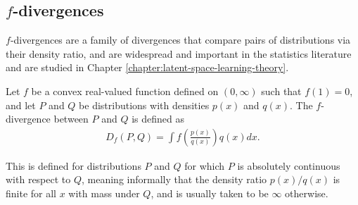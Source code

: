 \subsection{$f$-divergences}\label{subsec:f-divergences-intro}



$f$-divergences are a family of divergences that compare pairs of distributions via their density ratio, and are widespread and important in the statistics literature \citep{csiszar2004information, liese2006divergences, tsybakov2009} and are studied in Chapter \ref{chapter:latent-space-learning-theory}.

\medskip

\begin{definition}
Let $f$ be a convex real-valued function defined on $(0, \infty)$ such that $f(1)=0$, and let $P$ and $Q$ be distributions with densities $p(x)$ and $q(x)$.
The $f$-divergence between $P$ and $Q$ is defined as
%
\begin{align*}
D_f(P, Q) = \int f\left(\frac{p(x)}{q(x)}\right) q(x) dx.
\end{align*}
%
\end{definition}
This is defined for distributions $P$ and $Q$ for which $P$ is absolutely continuous with respect to $Q$, meaning informally that the density ratio $p(x)/q(x)$ is finite for all $x$ with mass under $Q$, and is usually taken to be $\infty$ otherwise.

